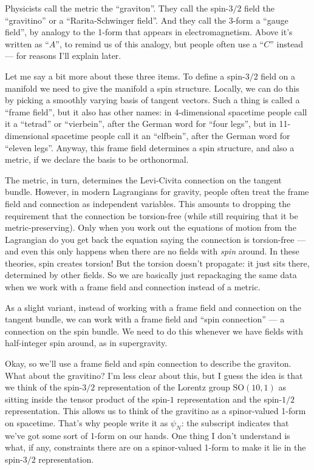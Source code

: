 \documentclass{article}
\begin{document}
Physicists call the metric the ``graviton''. They call the spin-\(3/2\)
field the ``gravitino'' or a ``Rarita-Schwinger field''. And they call
the 3-form a ``gauge field'', by analogy to the 1-form that appears in
electromagnetism. Above it's written as ``\(A\)'', to remind us of this
analogy, but people often use a ``\(C\)'' instead --- for reasons I'll
explain later.

Let me say a bit more about these three items. To define a spin-\(3/2\)
field on a manifold we need to give the manifold a spin structure.
Locally, we can do this by picking a smoothly varying basis of tangent
vectors. Such a thing is called a ``frame field'', but it also has other
names: in 4-dimensional spacetime people call it a ``tetrad'' or
``vierbein'', after the German word for ``four legs'', but in
11-dimensional spacetime people call it an ``elfbein'', after the German
word for ``eleven legs''. Anyway, this frame field determines a spin
structure, and also a metric, if we declare the basis to be orthonormal.

The metric, in turn, determines the Levi-Civita connection on the
tangent bundle. However, in modern Lagrangians for gravity, people often
treat the frame field and connection as independent variables. This
amounts to dropping the requirement that the connection be torsion-free
(while still requiring that it be metric-preserving). Only when you work
out the equations of motion from the Lagrangian do you get back the
equation saying the connection is torsion-free --- and even this only
happens when there are no fields with \emph{spin} around. In these
theories, spin creates torsion! But the torsion doesn't propagate: it
just sits there, determined by other fields. So we are basically just
repackaging the same data when we work with a frame field and connection
instead of a metric.

As a slight variant, instead of working with a frame field and
connection on the tangent bundle, we can work with a frame field and
``spin connection'' --- a connection on the spin bundle. We need to do
this whenever we have fields with half-integer spin around, as in
supergravity.

Okay, so we'll use a frame field and spin connection to describe the
graviton. What about the gravitino? I'm less clear about this, but I
guess the idea is that we think of the spin-\(3/2\) representation of
the Lorentz group \(\mathrm{SO}(10,1)\) as sitting inside the tensor
product of the spin-\(1\) representation and the spin-\(1/2\)
representation. This allows us to think of the gravitino as a
spinor-valued 1-form on spacetime. That's why people write it as
\(\psi_N\): the subscript indicates that we've got some sort of 1-form
on our hands. One thing I don't understand is what, if any, constraints
there are on a spinor-valued 1-form to make it lie in the spin-\(3/2\)
representation.
\end{document}
